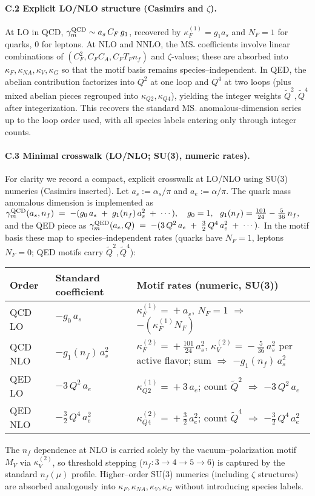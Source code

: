 \documentclass[epjc3]{svjour3}
\begin{document}
\paragraph{C.2 Explicit LO/NLO structure (Casimirs and $\zeta$).}
At LO in QCD, $\gamma_m^{\rm QCD}\sim a_s\,C_F\,g_1$, recovered by $\kappa_F^{(1)}=g_1 a_s$ and $N_F=1$ for quarks, $0$ for leptons. At NLO and NNLO, the MS$\bar{\ }$ coefficients involve linear combinations of $(C_F^2, C_F C_A, C_F T_F n_f)$ and $\zeta$-values; these are absorbed into $\kappa_F,\kappa_{NA},\kappa_V,\kappa_G$ so that the motif basis remains species–independent. In QED, the abelian contribution factorizes into $Q^{2}$ at one loop and $Q^{4}$ at two loops (plus mixed abelian pieces regrouped into $\kappa_{Q2},\kappa_{Q4}$), yielding the integer weights $\tilde Q^2,\tilde Q^4$ after integerization. This recovers the standard MS$\bar{\ }$ anomalous-dimension series up to the loop order used, with all species labels entering only through integer counts.

\paragraph{C.3 Minimal crosswalk (LO/NLO; SU(3), numeric rates).}
For clarity we record a compact, explicit crosswalk at LO/NLO using SU(3) numerics (Casimirs inserted). Let $a_s\!:=\!\alpha_s/\pi$ and $a_e\!:=\!\alpha/\pi$. The quark mass anomalous dimension is implemented as
\(
\gamma_m^{\rm QCD}(a_s,n_f)\;=\;-(g_0\,a_s\; +\; g_1(n_f)\,a_s^2\;+\;\cdots),\quad
g_0=1,\ \ g_1(n_f)=\tfrac{101}{24}-\tfrac{5}{36}\,n_f,
\)
and the QED piece as
\(
\gamma_m^{\rm QED}(a_e,Q)\;=\;-(3\,Q^2\,a_e\; +\; \tfrac{3}{2}\,Q^4\,a_e^2\;+\;\cdots).
\)
In the motif basis these map to species–independent rates (quarks have $N_F=1$, leptons $N_F=0$; QED motifs carry $\tilde Q^2,\tilde Q^4$):
\begin{center}
\begin{tabular}{l l l}
\toprule
Order & Standard coefficient & Motif rates (numeric, SU(3)) \\
\midrule
QCD LO & $-g_0\,a_s$ & $\kappa_F^{(1)}\!=\!+a_s$, $N_F\!=\!1$ $\Rightarrow$ $-(\kappa_F^{(1)}N_F)$ \\
QCD NLO & $-g_1(n_f)\,a_s^2$ & $\kappa_F^{(2)}\!=\!+\tfrac{101}{24}\,a_s^2$, $\kappa_V^{(2)}\!=\!-\tfrac{5}{36}\,a_s^2$ per active flavor; sum $\Rightarrow$ $-g_1(n_f)\,a_s^2$ \\
QED LO & $-3\,Q^2\,a_e$ & $\kappa_{Q2}^{(1)}\!=\!+3\,a_e$; count $\tilde Q^2$ $\Rightarrow$ $-3\,Q^2\,a_e$ \\
QED NLO & $-\tfrac{3}{2}\,Q^4\,a_e^2$ & $\kappa_{Q4}^{(2)}\!=\!+\tfrac{3}{2}\,a_e^2$; count $\tilde Q^4$ $\Rightarrow$ $-\tfrac{3}{2}\,Q^4\,a_e^2$ \\
\bottomrule
\end{tabular}
\end{center}
\noindent The $n_f$ dependence at NLO is carried solely by the vacuum–polarization motif $M_V$ via $\kappa_V^{(2)}$, so threshold stepping ($n_f:3\!\to\!4\!\to\!5\!\to\!6$) is captured by the standard $n_f(\mu)$ profile. Higher–order SU(3) numerics (including $\zeta$ structures) are absorbed analogously into $\kappa_F,\kappa_{NA},\kappa_V,\kappa_G$ without introducing species labels.
\end{document}
